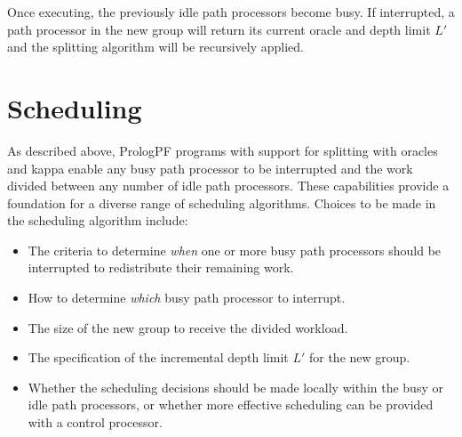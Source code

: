 Once executing, the previously idle path processors become busy.
If interrupted, a path processor in the new group 
will return its current oracle and depth
limit $L'$ and the splitting algorithm will be recursively applied.

\section{Scheduling}

As described above, PrologPF programs with support for splitting with oracles and
kappa enable any busy path processor to be interrupted and the work divided between
any number of idle path processors.  These capabilities provide a foundation for
a diverse range of scheduling algorithms.  Choices to be made in the scheduling
algorithm include:
\begin{itemize}
\item{The criteria to determine \textit{when} one or more busy path processors should be
  interrupted to redistribute their remaining work.}
\item{How to determine \textit{which} busy path processor to interrupt.}
\item{The size of the new group to receive the divided workload.}
\item{The specification of the incremental depth limit $L'$ for the new group.}
\item{Whether the scheduling decisions should be made locally within the
  busy or idle path processors, or whether more effective scheduling can be
  provided with a control processor.}
\end{itemize}

